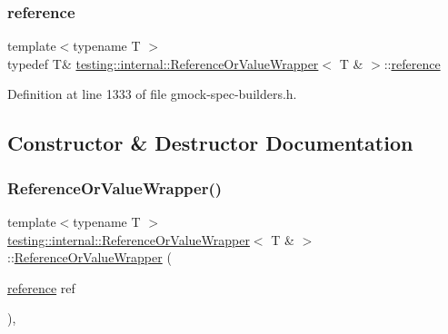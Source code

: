 \subsubsection{\texorpdfstring{reference}{reference}}
{\footnotesize\ttfamily template$<$typename T $>$ \\
typedef T\& \hyperlink{classtesting_1_1internal_1_1ReferenceOrValueWrapper}{testing\+::internal\+::\+Reference\+Or\+Value\+Wrapper}$<$ T \& $>$\+::\hyperlink{classtesting_1_1internal_1_1ReferenceOrValueWrapper_3_01T_01_6_01_4_a62e7f6ebcf40daa08130ea52fd0215ee}{reference}}



Definition at line 1333 of file gmock-\/spec-\/builders.\+h.



\subsection{Constructor \& Destructor Documentation}
\mbox{\label{classtesting_1_1internal_1_1ReferenceOrValueWrapper_3_01T_01_6_01_4_ad31b242ceae7f318096c78a798b33379}} 
\subsubsection{\texorpdfstring{Reference\+Or\+Value\+Wrapper()}{ReferenceOrValueWrapper()}}
{\footnotesize\ttfamily template$<$typename T $>$ \\
\hyperlink{classtesting_1_1internal_1_1ReferenceOrValueWrapper}{testing\+::internal\+::\+Reference\+Or\+Value\+Wrapper}$<$ T \& $>$\+::\hyperlink{classtesting_1_1internal_1_1ReferenceOrValueWrapper}{Reference\+Or\+Value\+Wrapper} (\begin{DoxyParamCaption}\item[{\hyperlink{classtesting_1_1internal_1_1ReferenceOrValueWrapper_3_01T_01_6_01_4_a62e7f6ebcf40daa08130ea52fd0215ee}{reference}}]{ref }\end{DoxyParamCaption})\hspace{0.3cm}{\ttfamily [inline]}, {\ttfamily [explicit]}}



